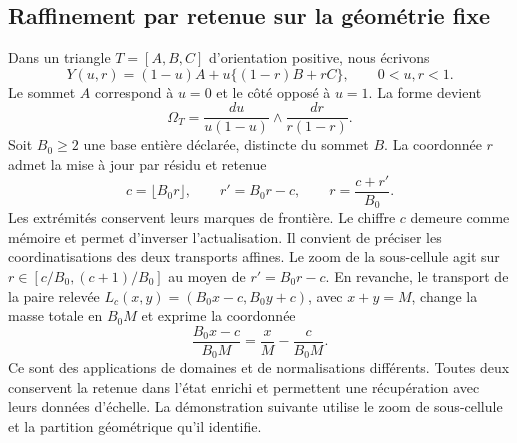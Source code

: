 \subsection{Raffinement par retenue sur la géométrie fixe}

Dans un triangle \(T=[A,B,C]\) d’orientation positive, nous écrivons
\begin{equation}
 Y(u,r)=(1-u)A+u\{(1-r)B+rC\},\qquad 0<u,r<1.
 \label{eq:polygon-blowdown}
\end{equation}
Le sommet \(A\) correspond à \(u=0\) et le côté opposé à \(u=1\).
La forme devient
\begin{equation}
 \Omega_T=\frac{du}{u(1-u)}\wedge\frac{dr}{r(1-r)}.
 \label{eq:polygon-product-form}
\end{equation}
Soit \(B_0\geq2\) une base entière déclarée, distincte du sommet \(B\).
La coordonnée \(r\) admet la mise à jour par résidu et retenue
\begin{equation}
 c=\lfloor B_0r\rfloor,\qquad r'=B_0r-c,\qquad
 r=\frac{c+r'}{B_0}.
 \label{eq:polygon-carry}
\end{equation}
Les extrémités conservent leurs marques de frontière. Le chiffre \(c\) demeure comme mémoire et permet d'inverser l'actualisation. Il convient de préciser les coordinatisations des deux transports affines. Le zoom de la sous-cellule agit sur \(r\in[c/B_0,(c+1)/B_0]\) au moyen de \(r'=B_0r-c\). En revanche, le transport de la paire relevée \(L_c(x,y)=(B_0x-c,B_0y+c)\), avec \(x+y=M\), change la masse totale en \(B_0M\) et exprime la coordonnée
\[
 \frac{B_0x-c}{B_0M}=\frac{x}{M}-\frac{c}{B_0M}.
\]
Ce sont des applications de domaines et de normalisations différents. Toutes deux conservent la retenue dans l'état enrichi et permettent une récupération avec leurs données d'échelle. La démonstration suivante utilise le zoom de sous-cellule et la partition géométrique qu'il identifie.

